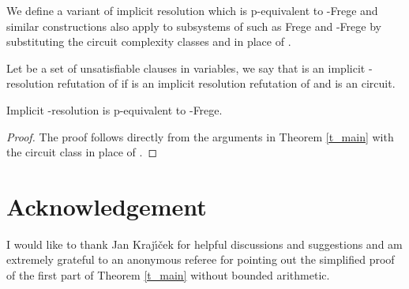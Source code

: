 \documentclass{LMCS}
\theoremstyle{plain}\newtheorem{satz}[thm]{Satz}
\begin{document}
\begin{cor}

\end{cor}

We define a variant of implicit resolution which is p-equivalent to -Frege and similar constructions also apply to subsystems of  such as Frege and -Frege by substituting the circuit complexity classes  and  in place of .

\begin{defi}
Let  be a set of unsatisfiable clauses in  variables, we say that  is an implicit -resolution refutation of  if  is an implicit resolution refutation of  and  is an  circuit.
\end{defi}

\begin{thm}
Implicit -resolution is p-equivalent to -Frege.
\begin{proof}
The proof follows directly from the arguments in Theorem \ref{t_main} with the circuit class  in place of .
\end{proof}
\end{thm}

\section*{Acknowledgement}
I would like to thank Jan Kraj{\'{\i}}{\v{c}}ek for helpful discussions and suggestions and am extremely grateful to an anonymous referee for pointing out the simplified proof of the first part of Theorem \ref{t_main} without bounded arithmetic.





\end{document}
